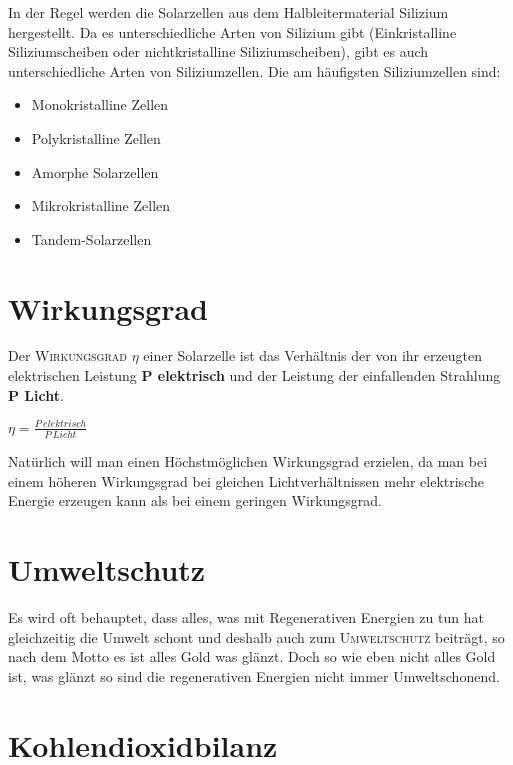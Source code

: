 \documentclass[12pt]{scrbook}
\begin{document}
In der Regel werden die Solarzellen aus dem Halbleitermaterial Silizium
hergestellt. Da es unterschiedliche Arten von Silizium gibt (Einkristalline
Siliziumscheiben oder nichtkristalline Siliziumscheiben), gibt es auch
unterschiedliche Arten von Siliziumzellen. Die am häufigsten Siliziumzellen sind:
\begin{itemize}
  \item Monokristalline Zellen
  \item Polykristalline Zellen
  \item Amorphe Solarzellen
  \item Mikrokristalline Zellen
  \item Tandem-Solarzellen
\end{itemize}

\section{Wirkungsgrad}

Der \textsc{Wirkungsgrad} $\eta$ einer Solarzelle ist das Verhältnis der von ihr erzeugten 
elektrischen Leistung {\bfseries P elektrisch} und der Leistung der einfallenden Strahlung {\bfseries P Licht}.

\vspace{12pt}
\begin{LARGE}
\begin{math} \eta = \frac{P\ elektrisch}{P\ Licht} \end{math}
\end{LARGE}

\vspace{12pt}
Natürlich will man einen Höchstmöglichen Wirkungsgrad erzielen, da man bei
einem höheren Wirkungsgrad bei gleichen Lichtverhältnissen mehr elektrische
Energie erzeugen kann als bei einem geringen Wirkungsgrad.


\section{Umweltschutz}

Es wird oft behauptet, dass alles, was mit Regenerativen Energien zu tun hat
gleichzeitig die Umwelt schont und deshalb auch zum \textsc{Umweltschutz} beiträgt, so
nach dem Motto es ist alles Gold was glänzt. Doch so wie eben nicht alles Gold
ist, was glänzt so sind die regenerativen Energien nicht immer Umweltschonend.

\section{Kohlendioxidbilanz}
\end{document}
